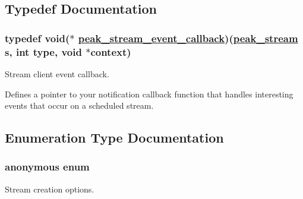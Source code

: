 \subsection{Typedef Documentation}
\hypertarget{group__stream_ga1}{
\subsubsection[peak\_\-stream\_\-event\_\-callback]{\setlength{\rightskip}{0pt plus 5cm}typedef void($\ast$ \hyperlink{group__stream_ga1}{peak\_\-stream\_\-event\_\-callback})(\hyperlink{group__stream_ga0}{peak\_\-stream} s, int type, void $\ast$context)}}
\label{group__stream_ga1}


Stream client event callback. 

Defines a pointer to your notification callback function that handles interesting events that occur on a scheduled stream. 

\subsection{Enumeration Type Documentation}
\hypertarget{group__stream_ga2}{
\subsubsection["@4]{\setlength{\rightskip}{0pt plus 5cm}anonymous enum}}
\label{group__stream_ga2}


Stream creation options. 

